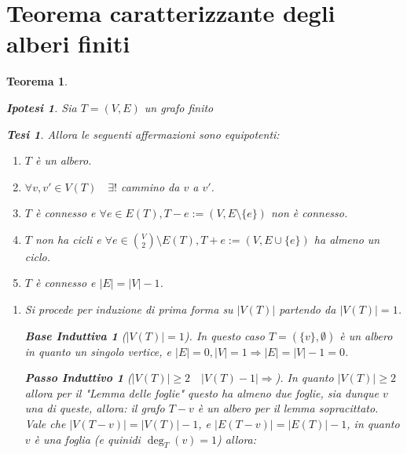 \documentclass{article}
\makeatletter
\renewenvironment{proof}[1][\proofname]{\par
    \pushQED{\qed}%
    \normalfont \topsep6\p@\@plus6\p@\relax
    \trivlist
    \item\relax
    {\itshape
    #1\@addpunct{.}}\hspace\labelsep\ignorespaces
    }{%
    \popQED\endtrivlist\@endpefalse
}
\newtheorem{theorem}{Teorema}[part]
\newtheorem{ipothesis}[lemma]{Ipotesi}
\newtheorem{thesis}[lemma]{Tesi}
\newtheorem*{base}{Base Induttiva}
\newtheorem*{step}{Passo Induttivo}
\makeatother
\begin{document}
    \section{Teorema caratterizzante degli alberi finiti}
        \begin{theorem}
            \begin{ipothesis}
                Sia \(T=(V,E)\) un grafo finito
            \end{ipothesis}
            \begin{thesis}
                Allora le seguenti affermazioni sono equipotenti:
                \begin{enumerate}
                    \item \(T\) è un albero.
                    \item \(\forall v,v' \in V(T)\quad\exists!\) cammino da \(v\) a \(v'\).
                    \item \(T\) è connesso e \(\forall e\in E(T), T-e:=(V,E\setminus\{e\})\) non è connesso.
                    \item \(T\) non ha cicli e \(\forall e\in \binom{V}{2}\setminus E(T), T+e:=(V,E\cup\{e\})\) ha almeno un ciclo.
                    \item \(T\) è connesso e \(|E|=|V|-1\).
                \end{enumerate}
            \end{thesis}
            \begin{proof}
                \begin{enumerate}
                    \item[$1\Rightarrow 5$)] Si procede per induzione di prima forma su \(|V(T)|\) partendo da \(|V(T)|=1\).
                        \begin{base}[$|V(T)|=1$]
                            In questo caso \(T=(\{v\},\emptyset)\) è un albero in quanto un singolo vertice, e \(|E|=0,|V|=1\Rightarrow |E|=|V|-1=0\).
                            \checkmark\end{base}
                        \begin{step}[$|V(T)|\geq2\quad |V(T)-1|\Longrightarrow$]
                            In quanto \(|V(T)|\geq 2\) allora per il "Lemma delle foglie" questo ha almeno due foglie, sia dunque \(v\) una di queste, allora:
                            il grafo \(T-v\) è un albero per il lemma sopracittato. Vale che \(|V(T-v)|=|V(T)|-1\), e \(|E(T-v)|=|E(T)|-1\), in quanto \(v\) è una foglia (e quinidi \(\deg_T(v)=1\)) allora: \[
                                \begin{aligned}

\end{aligned}\]
\end{step}
\end{enumerate}
\end{proof}
\end{theorem}
\end{document}

